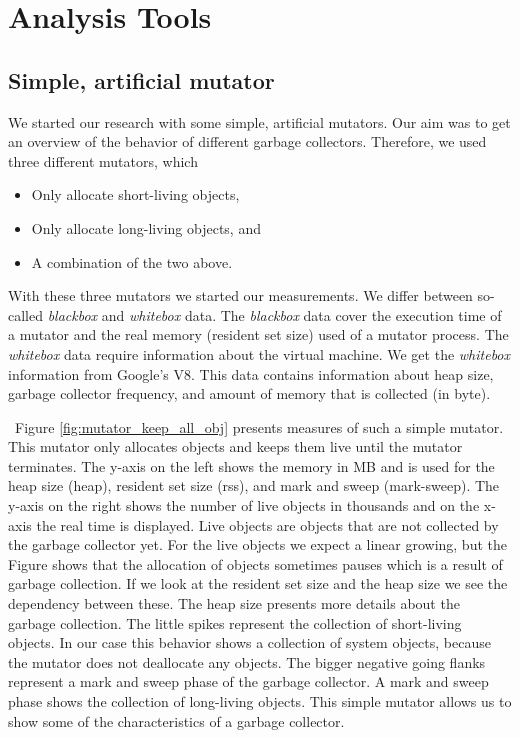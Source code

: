 
\section{Analysis Tools} \label{sec:analysis_tools}

\subsection{Simple, artificial mutator}

We started our research with some simple, artificial mutators. Our aim was to get an overview of the behavior of different \JS garbage collectors. Therefore, we used three different mutators, which
\begin{itemize}
	\item Only allocate short-living objects,
	\item Only allocate long-living objects, and 
	\item A combination of the two above.
\end{itemize}
With these three mutators we started our measurements. We differ between so-called \textit{blackbox} and \textit{whitebox} data. The \textit{blackbox} data cover the execution time of a mutator and the real memory (resident set size) used of a mutator process. The \textit{whitebox} data require information about the \JS virtual machine. We get the \textit{whitebox} information from Google's V8. This data contains information about heap size, garbage collector frequency, and amount of memory that is collected (in byte).

\
Figure \ref{fig:mutator_keep_all_obj} presents measures of such a simple mutator. This mutator only allocates objects and keeps them live until the mutator terminates. The y-axis on the left shows the memory in MB and is used for the heap size (heap), resident set size (rss), and mark and sweep (mark-sweep). The y-axis on the right shows the number of live objects in thousands and on the x-axis the real time is displayed. Live objects are objects that are not collected by the garbage collector yet. For the live objects we expect a linear growing, but the Figure shows that the allocation of objects sometimes pauses which is a result of garbage collection. If we look at the resident set size and the heap size we see the dependency between these. The heap size presents more details about the garbage collection. The little spikes represent the collection of short-living objects. In our case this behavior shows a collection of system objects, because the mutator does not deallocate any objects. The bigger negative going flanks represent a mark and sweep phase of the garbage collector. A mark and sweep phase shows the collection of long-living objects. This simple mutator allows us to show some of the characteristics of a garbage collector.

